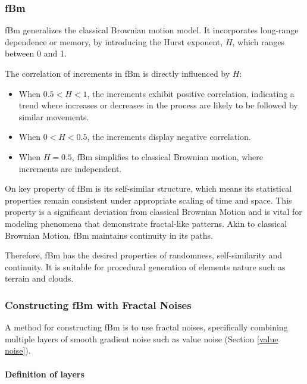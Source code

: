 \subsubsection{fBm}
\label{FBM}

fBm generalizes the classical Brownian motion model. It incorporates long-range dependence or memory,  by introducing the Hurst exponent, $H$, which ranges between 0 and 1. 

The correlation of increments in fBm is directly influenced by $H$:
\begin{itemize}
    \item When $0.5 < H < 1$, the increments exhibit positive correlation, indicating a trend where increases or decreases in the process are likely to be followed by similar movements.
    \item When $0 < H < 0.5$, the increments display negative correlation.
    \item When $H=0.5$, fBm simplifies to classical Brownian motion, where increments are independent.
\end{itemize}

On key property of fBm is its self-similar structure, which means its statistical properties remain consistent under appropriate scaling of time and space. This property is a significant deviation from classical Brownian Motion and is vital for modeling phenomena that demonstrate fractal-like patterns. Akin to classical Brownian Motion, fBm maintains continuity in its paths.

Therefore, fBm has the desired properties of randomness, self-similarity and continuity. It is suitable for procedural generation of elements nature such as terrain and clouds.

\subsubsection{Constructing fBm with Fractal Noises}
\label{construct fbm}

 

A method for constructing fBm is to use fractal noises, specifically combining multiple layers of smooth gradient noise such as value noise (Section \ref{value noise}).

\paragraph{Definition of layers}

